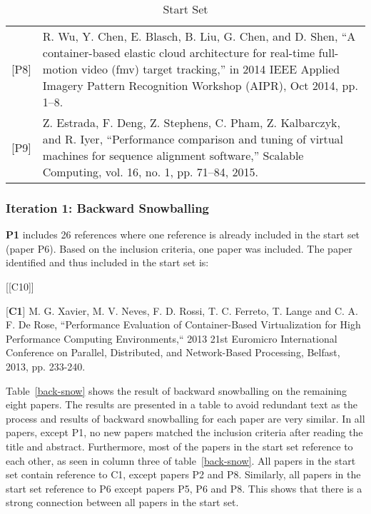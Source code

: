 \begin{table}[]
\begin{tabular}{lp{13cm}}
{[}P8{]}  & R. Wu, Y. Chen, E. Blasch, B. Liu, G. Chen, and D. Shen, “A container-based elastic cloud architecture for real-time full-motion video (fmv) target tracking,” in 2014 IEEE Applied Imagery Pattern Recognition Workshop (AIPR), Oct 2014, pp. 1–8.                                                                                  \\
{[}P9{]} & Z. Estrada, F. Deng, Z. Stephens, C. Pham, Z. Kalbarczyk, and R. Iyer, “Performance comparison and tuning of virtual machines for sequence alignment software,” Scalable Computing, vol. 16, no. 1, pp. 71–84, 2015.
\end{tabular}
\centering
\caption{Start Set}
\label{lr-startset}
\end{table}
\subsubsection*{Iteration 1: Backward Snowballing}
\textbf{P1} includes 26 references where one reference is already included in the start set (paper P6). Based on the inclusion criteria, one paper was included. The paper identified and thus included in the start set is: \\

\begin{labeling}{[{[}C10{]}]}
\item [{[}\textbf{C1}{]}]  M. G. Xavier, M. V. Neves, F. D. Rossi, T. C. Ferreto, T. Lange and C. A. F. De Rose, “Performance Evaluation of Container-Based Virtualization for High Performance Computing Environments,“ 2013 21st Euromicro International Conference on Parallel, Distributed, and Network-Based Processing, Belfast, 2013, pp. 233-240.
\item
\end{labeling}

Table~\ref{back-snow} shows the result of backward snowballing on the remaining eight papers. The results are presented in a table to avoid redundant text as the process and results of backward snowballing for each paper are very similar. In all papers, except P1, no new papers matched the inclusion criteria after reading the title and abstract. Furthermore, most of the papers in the start set reference to each other, as seen in column three of table~\ref{back-snow}. All papers in the start set contain reference to C1, except papers P2 and P8. Similarly, all papers in the start set reference to P6 except papers P5, P6 and P8. This shows that there is a strong connection between all papers in the start set. 

